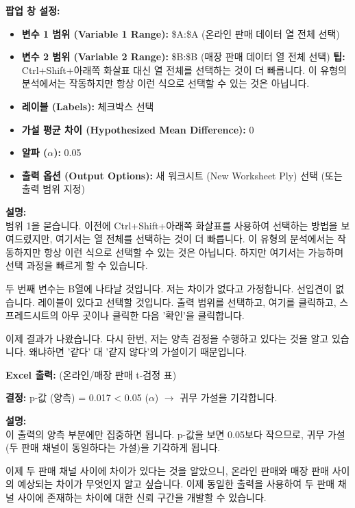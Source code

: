 \documentclass[11pt,a4paper]{article}
\begin{document}
\begin{tcolorbox}[mybox, title=온라인/매장 Excel 워크시트 (5/10): t-검정 설정 입력 (열 선택)]
\textbf{팝업 창 설정:}
\begin{itemize}
    \item \textbf{변수 1 범위 (Variable 1 Range):} \$A:\$A (온라인 판매 데이터 열 전체 선택)
    \item \textbf{변수 2 범위 (Variable 2 Range):} \$B:\$B (매장 판매 데이터 열 전체 선택)
    \textbf{팁:} Ctrl+Shift+아래쪽 화살표 대신 열 전체를 선택하는 것이 더 빠릅니다. 이 유형의 분석에서는 작동하지만 항상 이런 식으로 선택할 수 있는 것은 아닙니다.
    \item \textbf{레이블 (Labels):} 체크박스 선택
    \item \textbf{가설 평균 차이 (Hypothesized Mean Difference):} 0
    \item \textbf{알파 ($\alpha$):} 0.05
    \item \textbf{출력 옵션 (Output Options):} 새 워크시트 (New Worksheet Ply) 선택 (또는 출력 범위 지정)
\end{itemize}

\textbf{설명:} \\
범위 1을 묻습니다. 이전에 Ctrl+Shift+아래쪽 화살표를 사용하여 선택하는 방법을 보여드렸지만, 여기서는 열 전체를 선택하는 것이 더 빠릅니다. 이 유형의 분석에서는 작동하지만 항상 이런 식으로 선택할 수 있는 것은 아닙니다. 하지만 여기서는 가능하며 선택 과정을 빠르게 할 수 있습니다.

두 번째 변수는 B열에 나타날 것입니다. 저는 차이가 없다고 가정합니다. 선입견이 없습니다. 레이블이 있다고 선택할 것입니다. 출력 범위를 선택하고, 여기를 클릭하고, 스프레드시트의 아무 곳이나 클릭한 다음 '확인'을 클릭합니다.

이제 결과가 나왔습니다. 다시 한번, 저는 양측 검정을 수행하고 있다는 것을 알고 있습니다. 왜냐하면 '같다' 대 '같지 않다'의 가설이기 때문입니다.
\end{tcolorbox}

\begin{tcolorbox}[mybox, title=온라인/매장 Excel 워크시트 (6/10): 결과 분석 및 결정]
\textbf{Excel 출력:} (온라인/매장 판매 t-검정 표)

\textbf{결정:}
p-값 (양측) = 0.017 < 0.05 ($\alpha$) $\rightarrow$ 귀무 가설을 기각합니다.

\textbf{설명:} \\
이 출력의 양측 부분에만 집중하면 됩니다. p-값을 보면 0.05보다 작으므로, 귀무 가설(두 판매 채널이 동일하다는 가설)을 기각하게 됩니다.

이제 두 판매 채널 사이에 차이가 있다는 것을 알았으니, 온라인 판매와 매장 판매 사이의 예상되는 차이가 무엇인지 알고 싶습니다. 이제 동일한 출력을 사용하여 두 판매 채널 사이에 존재하는 차이에 대한 신뢰 구간을 개발할 수 있습니다.
\end{tcolorbox}
\end{document}
